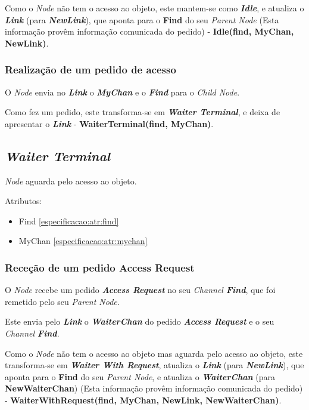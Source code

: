 Como o \emph{Node} não tem o acesso ao objeto, este mantem-se como \emph{\textbf{Idle}}, e atualiza o \textbf{\emph{Link}} (para \textbf{\emph{NewLink}}), que aponta para o \textbf{Find} do seu \emph{Parent Node} (Esta informação provêm informação comunicada do pedido) - \textbf{Idle(find, MyChan, NewLink)}.



\subsubsection{Realização de um pedido de acesso}
O \emph{Node} envia no \textbf{\emph{Link}} o \textbf{\emph{MyChan}} e o \textbf{\emph{Find}} para o \emph{Child Node}.

Como fez um pedido, este transforma-se em \emph{\textbf{Waiter Terminal}}, e deixa de apresentar o \textbf{\emph{Link}} - \textbf{WaiterTerminal(find, MyChan)}.

\subsection{\emph{Waiter Terminal}}
\label{especificacao:nodes:waiter_terminal}

\emph{Node} aguarda pelo acesso ao objeto.

Atributos:
\begin{itemize}
    \item Find \ref{especificacao:atr:find} 
    \item MyChan \ref{especificacao:atr:mychan} 
\end{itemize}

\subsubsection{Receção de um pedido Access Request}
O \emph{Node} recebe um pedido \emph{\textbf{Access Request}} no seu \emph{Channel \textbf{Find}}, que foi remetido pelo seu \emph{Parent Node}.

Este envia pelo \textbf{\emph{Link}} o \textbf{\emph{WaiterChan}} do pedido \emph{\textbf{Access Request}} e o seu \emph{Channel \textbf{Find}}.

Como o \emph{Node} não tem o acesso ao objeto mas aguarda pelo acesso ao objeto, este transforma-se em \emph{\textbf{Waiter With Request}}, atualiza o \textbf{\emph{Link}} (para \textbf{\emph{NewLink}}), que aponta para o \textbf{Find} do seu \emph{Parent Node}, e atualiza o \textbf{\emph{WaiterChan}} (para \textbf{NewWaiterChan}) (Esta informação provêm informação comunicada do pedido) - \textbf{WaiterWithRequest(find, MyChan, NewLink, NewWaiterChan)}.


